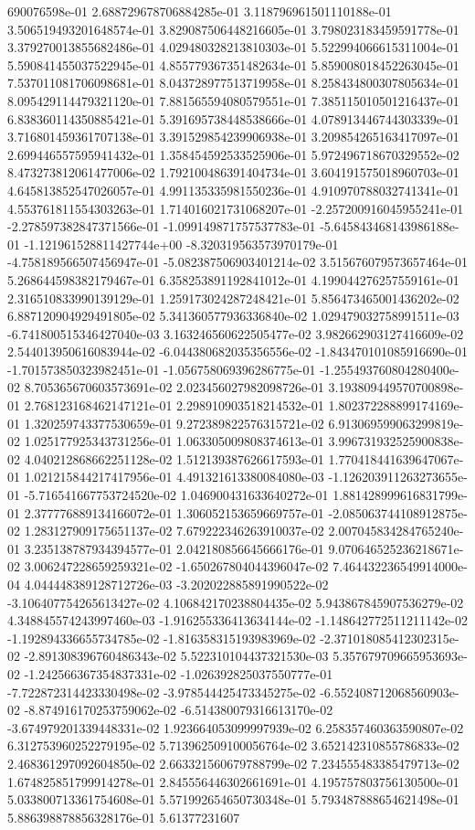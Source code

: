 690076598e-01	2.688729678706884285e-01	3.118796961501110188e-01	3.506519493201648574e-01	3.829087506448216605e-01	3.798023183459591778e-01	3.379270013855682486e-01	4.029480328213810303e-01	5.522994066615311004e-01	5.590841455037522945e-01	4.855779367351482634e-01	5.859008018452263045e-01	7.537011081706098681e-01	8.043728977513719958e-01	8.258434800307805634e-01	8.095429114479321120e-01	7.881565594080579551e-01	7.385115010501216437e-01	6.838360114350885421e-01	5.391695738448538666e-01	4.078913446744303339e-01	3.716801459361707138e-01	3.391529854239906938e-01	3.209854265163417097e-01	2.699446557595941432e-01	1.358454592533525906e-01	5.972496718670329552e-02	8.473273812061477006e-02	1.792100486391404734e-01	3.604191575018960703e-01	4.645813852547026057e-01	4.991135335981550236e-01	4.910970788032741341e-01	4.553761811554303263e-01	1.714016021731068207e-01	-2.257200916045955241e-01	-2.278597382847371566e-01	-1.099149871757537783e-01	-5.645843468143986188e-01	-1.121961528811427744e+00	-8.320319563573970179e-01	-4.758189566507456947e-01	-5.082387506903401214e-02	3.515676079573657464e-01	5.268644598382179467e-01	6.358253891192841012e-01	4.199044276257559161e-01	2.316510833990139129e-01	1.259173024287248421e-01	5.856473465001436202e-02	6.887120904929491805e-02	5.341360577936336840e-02	1.029479032758991511e-03	-6.741800515346427040e-03	3.163246560622505477e-02	3.982662903127416609e-02	2.544013950616083944e-02	-6.044380682035356556e-02	-1.843470101085916690e-01	-1.701573850323982451e-01	-1.056758069396286775e-01	-1.255493760804280400e-02	8.705365670603573691e-02	2.023456027982098726e-01	3.193809449570700898e-01	2.768123168462147121e-01	2.298910903518214532e-01	1.802372288899174169e-01	1.320259743377530659e-01	9.272389822576315721e-02	6.913069599063299819e-02	1.025177925343731256e-01	1.063305009808374613e-01	3.996731932525900838e-02	4.040212868662251128e-02	1.512139387626617593e-01	1.770418441639647067e-01	1.021215844217417956e-01	4.491321613380084080e-03	-1.126203911263273655e-01	-5.716541667753724520e-02	1.046900431633640272e-01	1.881428999616831799e-01	2.377776889134166072e-01	1.306052153659669757e-01	-2.085063744108912875e-02	1.283127909175651137e-02	7.679222346263910037e-02	2.007045834284765240e-01	3.235138787934394577e-01	2.042180856645666176e-01	9.070646525236218671e-02	3.006247228659259321e-02	-1.650267804044396047e-02	7.464432236549914000e-04	4.044448389128712726e-03	-3.202022885891990522e-02	-3.106407754265613427e-02	4.106842170238804435e-02	5.943867845907536279e-02	4.348845574243997460e-03	-1.916255336413634144e-02	-1.148642772511211142e-02	-1.192894336655734785e-02	-1.816358315193983969e-02	-2.371018085412302315e-02	-2.891308396760486343e-02	5.522310104437321530e-03	5.357679709665953693e-02	-1.242566367354837331e-02	-1.026392825037550777e-01	-7.722872314423330498e-02	-3.978544425473345275e-02	-6.552408712068560903e-02	-8.874916170253759062e-02	-6.514380079316613170e-02	-3.674979201339448331e-02	1.923664053099997939e-02	6.258357460363590807e-02	6.312753960252279195e-02	5.713962509100056764e-02	3.652142310855786833e-02	2.468361297092604850e-02	2.663321560679788799e-02	7.234555483385479713e-02	1.674825851799914278e-01	2.845556446302661691e-01	4.195757803756130500e-01	5.033800713361754608e-01	5.571992654650730348e-01	5.793487888654621498e-01	5.886398878856328176e-01	5.61377231607